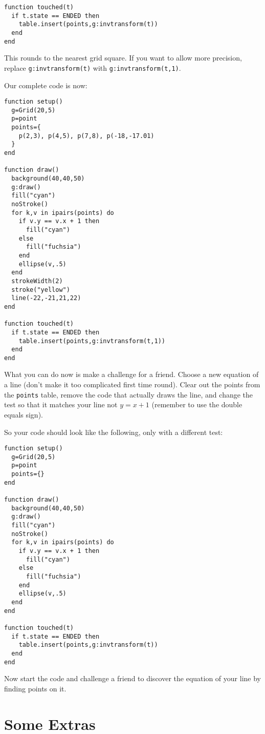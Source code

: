 \documentclass[
  xhtml,%
  use filename%
]{internet}
\begin{document}
\begin{verbatim}
function touched(t)
  if t.state == ENDED then
    table.insert(points,g:invtransform(t))
  end
end
\end{verbatim}

This rounds to the nearest grid square.
If you want to allow more precision, replace \verb+g:invtransform(t)+ with \verb+g:invtransform(t,1)+.

Our complete code is now:

\begin{verbatim}
function setup()
  g=Grid(20,5)
  p=point
  points={
    p(2,3), p(4,5), p(7,8), p(-18,-17.01)
  }
end

function draw()
  background(40,40,50)
  g:draw()
  fill("cyan")
  noStroke()
  for k,v in ipairs(points) do
    if v.y == v.x + 1 then
      fill("cyan")
    else
      fill("fuchsia")
    end
    ellipse(v,.5)
  end
  strokeWidth(2)
  stroke("yellow")
  line(-22,-21,21,22)
end

function touched(t)
  if t.state == ENDED then
    table.insert(points,g:invtransform(t,1))
  end
end
\end{verbatim}

What you can do now is make a challenge for a friend.
Choose a new equation of a line
(don't make it too complicated first time round).
Clear out the points from the \verb+points+ table, remove the code that actually draws the line, and change the test so that it matches your line not \(y = x + 1\) (remember to use the double equals sign).

So your code should look like the following, only with a different test:

\begin{verbatim}
function setup()
  g=Grid(20,5)
  p=point
  points={}
end

function draw()
  background(40,40,50)
  g:draw()
  fill("cyan")
  noStroke()
  for k,v in ipairs(points) do
    if v.y == v.x + 1 then
      fill("cyan")
    else
      fill("fuchsia")
    end
    ellipse(v,.5)
  end
end

function touched(t)
  if t.state == ENDED then
    table.insert(points,g:invtransform(t))
  end
end
\end{verbatim}

Now start the code and challenge a friend to discover the equation of your line by finding points on it.

\section{Some Extras}
\end{document}
